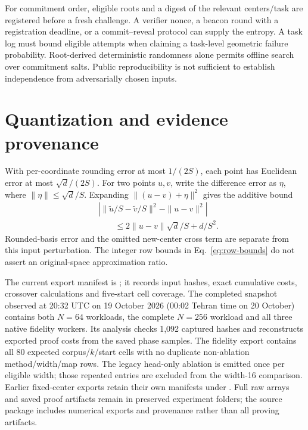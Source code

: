 For commitment order, eligible roots and a digest of the relevant centers/task are registered before a fresh challenge. A verifier nonce, a beacon round with a registration deadline, or a commit--reveal protocol can supply the entropy. A task log must bound eligible attempts when claiming a task-level geometric failure probability. Root-derived deterministic randomness alone permits offline search over commitment salts. Public reproducibility is not sufficient to establish independence from adversarially chosen inputs.

\section{Quantization and evidence provenance}\label{app:configurations}
With per-coordinate rounding error at most $1/(2S)$, each point has Euclidean error at most $\sqrt d/(2S)$. For two points $u,v$, write the difference error as $\eta$, where $\|\eta\|\le\sqrt d/S$. Expanding $\|(u-v)+\eta\|^2$ gives the additive bound
\begin{equation}
\begin{aligned}
&\left|\|\widetilde u/S-\widetilde v/S\|^2-\|u-v\|^2\right|\\
&\qquad\le2\|u-v\|\sqrt d/S+d/S^2.
\end{aligned}
\end{equation}
Rounded-basis error and the omitted new-center cross term are separate from this input perturbation. The integer row bounds in Eq.~\eqref{eq:row-bounds} do not assert an original-space approximation ratio.

The current export manifest is ; it records input hashes, exact cumulative costs, crossover calculations and five-start cell coverage. The completed snapshot observed at 20:32 UTC on 19 October 2026 (00:02 Tehran time on 20 October) contains both $N=64$ workloads, the complete $N=256$ workload and all three native fidelity workers. Its analysis checks 1,092 captured hashes and reconstructs exported proof costs from the saved phase samples. The fidelity export contains all 80 expected corpus/$k$/start cells with no duplicate non-ablation method/width/map rows. The legacy head-only ablation is emitted once per eligible width; those repeated entries are excluded from the width-16 comparison. Earlier fixed-center exports retain their own manifests under . Full raw arrays and saved proof artifacts remain in preserved experiment folders; the source package includes numerical exports and provenance rather than all proving artifacts.
